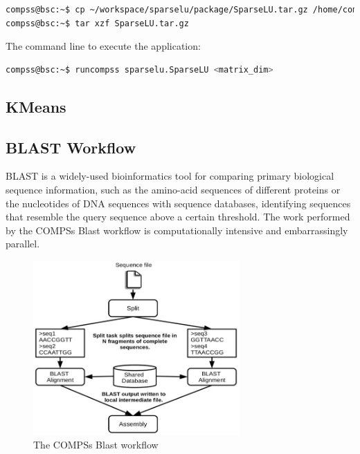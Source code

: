 \begin{lstlisting}[language=bash]
compss@bsc:~$ cp ~/workspace/sparselu/package/SparseLU.tar.gz /home/compss/
compss@bsc:~$ tar xzf SparseLU.tar.gz
\end{lstlisting}

The command line to execute the application:

\begin{lstlisting}[language=bash]
compss@bsc:~$ runcompss sparselu.SparseLU <matrix_dim>
\end{lstlisting}


\subsection{KMeans}


\subsection{BLAST Workflow}
BLAST is a widely-used bioinformatics tool for comparing primary biological sequence information, such as 
the amino-acid sequences of different proteins or the nucleotides of DNA sequences with sequence databases, 
identifying sequences that resemble the query sequence above a certain threshold. 
The work performed by the COMPSs Blast workflow is computationally intensive and embarrassingly parallel.

\begin{figure}[ht!]
  \centering
    \includegraphics[width=0.7\textwidth]{./Sections/2_Java/Figures/blast_workflow.jpeg}
    \caption{The COMPSs Blast workflow}
    \label{fig:BLAST_workflow}
\end{figure}

